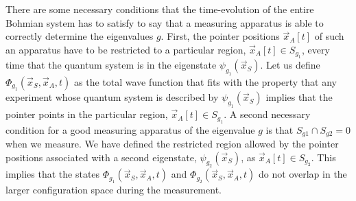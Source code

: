 \documentclass[nofootinbib, secnumarabic, amsmath, nobibnotes,10pt,aps,pra]{revtex4-1}
\begin{document}
There are some necessary conditions that the time-evolution of the 
entire Bohmian system has to satisfy to say that a measuring
apparatus is able to correctly determine the eigenvalues $g$. First,
the pointer positions $\vec x_A[t]$ of such an apparatus have to be
restricted to a particular region, $\vec x_A[t]\in S_{g_1}$, every
time that the quantum system is in the eigenstate $\psi_{g_1}(\vec
x_S)$. Let us define $\Phi_{g_1}(\vec x_S,\vec x_A,t)$ as the total
wave function that fits with the property that any experiment whose
quantum system is described by $\psi_{g_1}(\vec x_S)$ implies that
the pointer points in the particular region, $\vec x_A[t]\in
S_{g_1}$. A second necessary condition for a good measuring
apparatus of the eigenvalue $g$ is that $S_{g1} \cap S_{g2} = 0$
when we measure. We have defined the restricted region
allowed by the pointer positions associated with a second
eigenstate, $\psi_{g_2}(\vec x_S)$, as $\vec x_A[t]\in S_{g_2}$.
This implies that the states $\Phi_{g_1}(\vec x_S,\vec x_A,t)$ and
$\Phi_{g_2}(\vec x_S,\vec x_A,t)$ do not overlap in the larger
configuration space during the measurement.
\end{document}
